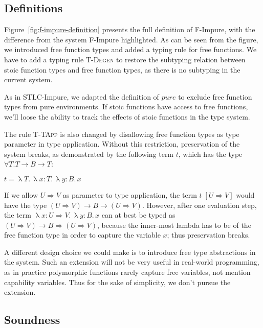 \subsection{Definitions}

Figure~\ref{fig:f-impure-definition} presents the full definition of
F-Impure, with the difference from the system F-Impure highlighted. As
can be seen from the figure, we introduced free function types and
added a typing rule for free functions. We have to add a typing rule
\textsc{T-Degen} to restore the subtyping relation between stoic
function types and free function types, as there is no subtyping in
the current system.

As in STLC-Impure, we adapted the definition of $pure$ to exclude free
function types from pure environments. If stoic functions have access
to free functions, we'll loose the ability to track the effects of
stoic functions in the type system.

The rule \textsc{T-TApp} is also changed by disallowing free function
types as type parameter in type application. Without this restriction,
preservation of the system breaks, as demonstrated by the following
term $t$, which has the type $\forall T. T \to B \to T$:

\begin{center}
  $t = \uplambda T. \, \uplambda x{:}T. \, \uplambda y{:}B. \, x$
\end{center}

If we allow $U \Rightarrow V$ as parameter to type application, the
term $t \; [U \Rightarrow V]$ would have the type
$(U \Rightarrow V) \to B \to (U \Rightarrow V)$.  However, after one
evaluation step, the term
$\uplambda x{:}U \Rightarrow V. \, \uplambda y{:}B. \, x$ can at best
be typed as $(U \Rightarrow V) \to B \Rightarrow (U \Rightarrow V)$,
because the inner-most lambda has to be of the free function type in
order to capture the variable $x$; thus preservation breaks.

A different design choice we could make is to introduce free type
abstractions in the system. Such an extension will not be very useful
in real-world programming, as in practice polymorphic functions rarely
capture free variables, not mention capability variables. Thus for the
sake of simplicity, we don't pursue the extension.

\subsection{Soundness}

